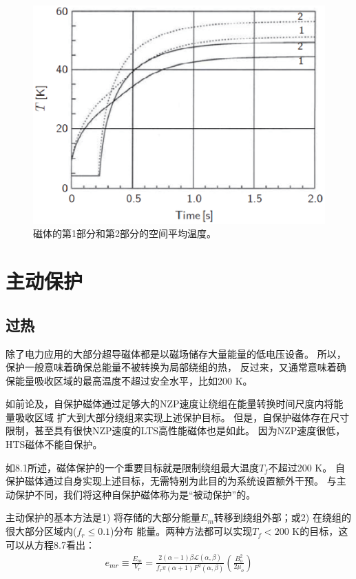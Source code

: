 \begin{figure}
	\centering
	\includegraphics[scale=0.6]{chpt8/figs/fig8.16.eps}
	\caption{磁体的第1部分和第2部分的空间平均温度。}
\end{figure}



\section{主动保护}
\subsection{过热}
除了电力应用的大部分超导磁体都是以磁场储存大量能量的低电压设备。
所以，保护一般意味着确保总能量不被转换为局部绕组的热，
反过来，又通常意味着确保能量吸收区域的最高温度不超过安全水平，比如200 K。

如前论及，自保护磁体通过足够大的NZP速度让绕组在能量转换时间尺度内将能量吸收区域
扩大到大部分绕组来实现上述保护目标。
但是，自保护磁体存在尺寸限制，甚至具有很快NZP速度的LTS高性能磁体也是如此。
因为NZP速度很低，HTS磁体不能自保护。

如8.1所述，磁体保护的一个重要目标就是限制绕组最大温度$T_f$不超过200 K。
自保护磁体通过自身实现上述目标，无需特别为此目的为系统设置额外干预。
与主动保护不同，我们将这种自保护磁体称为是“被动保护”的。

主动保护的基本方法是1) 将存储的大部分能量$E_m$转移到绕组外部；或2) 在绕组的很大部分区域内($f_r\le 0.1$)分布
能量。两种方法都可以实现$T_f<200$ K的目标，这可以从方程8.7看出：
\begin{align*}%
e_{mr}\equiv\frac{E_m}{V_r}=\frac{2(\alpha-1)\beta\mathcal{L}(\alpha,\beta)}{f_r\pi(\alpha+1)F^2(\alpha,\beta)}\left(\frac{B_{o}^{2}}{2\mu_o}\right) \tag{8.7}
\end{align*}

